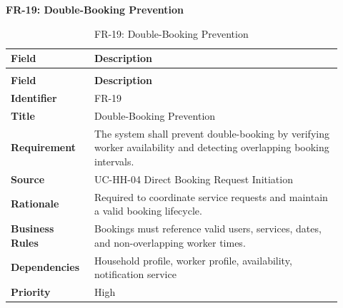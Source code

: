 \documentclass[12pt,a4paper]{article}
\begin{document}
\noindent\textbf{FR-19: Double-Booking Prevention}\par
\vspace{4pt}
\begingroup\small\setlength{\tabcolsep}{4pt}\renewcommand{\arraystretch}{1.15}
\begin{longtable}{|>{\raggedright\arraybackslash}p{0.22\linewidth}|>{\raggedright\arraybackslash}p{0.70\linewidth}|}
\caption{FR-19: Double-Booking Prevention}\label{tab:fr-19}\\
\hline
\textbf{Field} & \textbf{Description} \\ \hline
\endfirsthead
\multicolumn{2}{c}{Table \thetable\ Double-Booking Prevention (continued)}\\
\hline
\textbf{Field} & \textbf{Description} \\ \hline
\endhead
\textbf{Identifier} & FR-19 \\ \hline
\textbf{Title} & Double-Booking Prevention \\ \hline
\textbf{Requirement} & The system shall prevent double-booking by verifying worker availability and detecting overlapping booking intervals. \\ \hline
\textbf{Source} & UC-HH-04 Direct Booking Request Initiation \\ \hline
\textbf{Rationale} & Required to coordinate service requests and maintain a valid booking lifecycle. \\ \hline
\textbf{Business Rules} & Bookings must reference valid users, services, dates, and non-overlapping worker times. \\ \hline
\textbf{Dependencies} & Household profile, worker profile, availability, notification service \\ \hline
\textbf{Priority} & High \\ \hline
\end{longtable}
\endgroup
\end{document}
